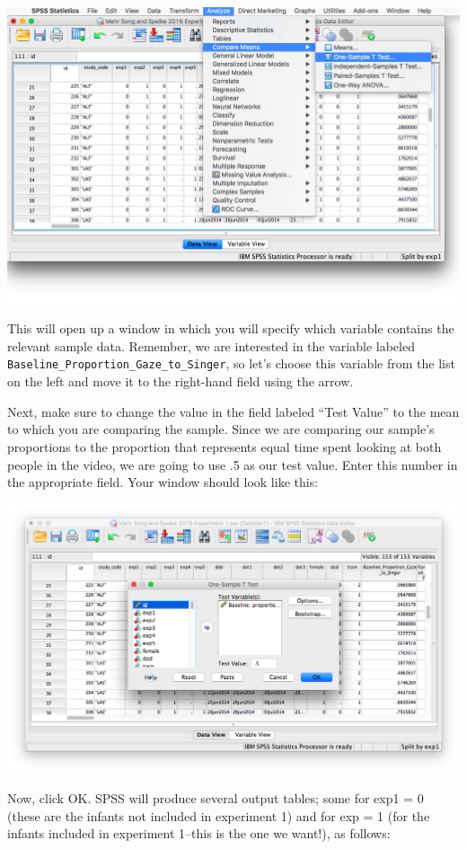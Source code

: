 \documentclass[
]{book}
\begin{document}
\includegraphics{img/6.4.14.png}

This will open up a window in which you will specify which variable contains the relevant sample data. Remember, we are interested in the variable labeled \texttt{Baseline\_Proportion\_Gaze\_to\_Singer}, so let's choose this variable from the list on the left and move it to the right-hand field using the arrow.

Next, make sure to change the value in the field labeled ``Test Value'' to the mean to which you are comparing the sample. Since we are comparing our sample's proportions to the proportion that represents equal time spent looking at both people in the video, we are going to use .5 as our test value. Enter this number in the appropriate field. Your window should look like this:

\includegraphics{img/6.4.15.png}

Now, click {OK}. SPSS will produce several output tables; some for exp1 = 0 (these are the infants not included in experiment 1) and for exp = 1 (for the infants included in experiment 1--this is the one we want!), as follows:
\end{document}
